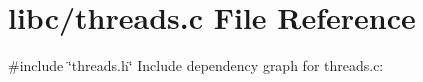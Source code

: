 \hypertarget{a00062}{}\section{libc/threads.c File Reference}
\label{a00062}
{\ttfamily \#include \char`\"{}threads.\+h\char`\"{}}\newline
Include dependency graph for threads.\+c\+:

